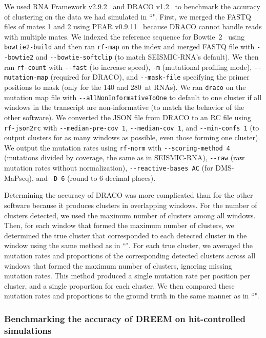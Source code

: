 \documentclass[unnumsec,webpdf,contemporary,large]{oup-authoring-template}%
\theoremstyle{thmstyleone}%
\theoremstyle{thmstyletwo}%
\theoremstyle{thmstylethree}%
\begin{document}
We used RNA Framework v2.9.2~\cite{Incarnato2018} and DRACO v1.2~\cite{Morandi2021} to benchmark the accuracy of clustering on the data we had simulated in ``".
First, we merged the FASTQ files of mates 1 and 2 using PEAR v0.9.11~\cite{Zhang2013} because DRACO cannot handle reads with multiple mates.
We indexed the reference sequence for Bowtie~2~\cite{Langmead2012} using \verb|bowtie2-build| and then ran \verb|rf-map| on the index and merged FASTQ file with \verb|--bowtie2| and \verb|--bowtie-softclip| (to match SEISMIC-RNA's default).
We then ran \verb|rf-count| with \verb|--fast| (to increase speed), \verb|-m| (mutational profiling mode), \verb|--mutation-map| (required for DRACO), and \verb|--mask-file| specifying the primer positions to mask (only for the 140 and 280~nt RNAs).
We ran \verb|draco| on the mutation map file with \verb|--allNonInformativeToOne| to default to one cluster if all windows in the transcript are non-informative (to match the behavior of the other software).
We converted the JSON file from DRACO to an RC file using \verb|rf-json2rc| with \verb|--median-pre-cov 1|, \verb|--median-cov 1|, and \verb|--min-confs 1| (to output clusters for as many windows as possible, even those forming one cluster).
We output the mutation rates using \verb|rf-norm| with \verb|--scoring-method 4| (mutations divided by coverage, the same as in SEISMIC-RNA), \verb|--raw| (raw mutation rates without normalization), \verb|--reactive-bases AC| (for DMS-MaPseq), and \verb|-D 6| (round to 6 decimal places).

Determining the accuracy of DRACO was more complicated than for the other software because it produces clusters in overlapping windows.
For the number of clusters detected, we used the maximum number of clusters among all windows.
Then, for each window that formed the maximum number of clusters, we determined the true cluster that corresponded to each detected cluster in the window using the same method as in ``".
For each true cluster, we averaged the mutation rates and proportions of the corresponding detected clusters across all windows that formed the maximum number of clusters, ignoring missing mutation rates.
This method produced a single mutation rate per position per cluster, and a single proportion for each cluster.
We then compared these mutation rates and proportions to the ground truth in the same manner as in ``".

\subsubsection{Benchmarking the accuracy of DREEM on hit-controlled simulations}
\label{benchmark-accuracy-dreem}
\end{document}
